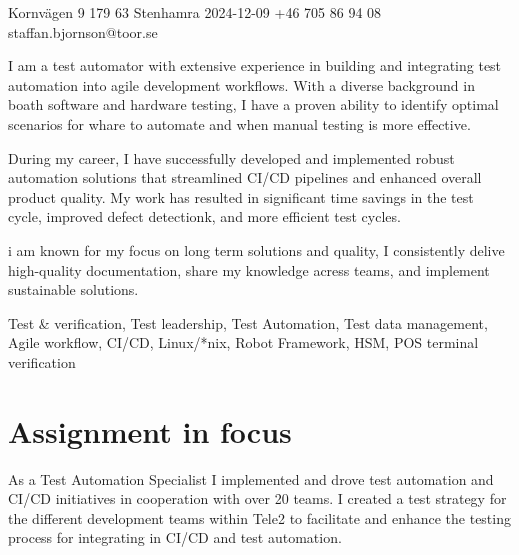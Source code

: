 \documentclass{sobCV}[2015/09/08]
\begin{document}
       {Kornvägen 9}
       {179 63 Stenhamra}
       {2024-12-09}
       {+46 705 86 94 08} 
       {staffan.bjornson@toor.se}






   {
       I am a test automator with extensive experience in building and
       integrating test automation into agile development workflows. With a
       diverse background in boath software and hardware testing, I have a
       proven ability to identify optimal scenarios for whare to automate and
       when manual testing is more effective. 

       During my career, I have successfully developed and implemented robust
       automation solutions that streamlined CI/CD pipelines and enhanced
       overall product quality. My work has resulted in significant time
       savings in the test cycle, improved defect detectionk, and more
       efficient test cycles.

       i am known for my focus on long term solutions and quality, I
       consistently delive high-quality documentation, share my knowledge
       acress teams, and implement sustainable solutions.
   }{
       Test \& verification,
       Test leadership,
       Test Automation, 
       Test data management,
       Agile workflow,
       CI/CD,
       Linux/*nix,
       Robot Framework,
       HSM,
       POS terminal verification
    }


\section{Assignment in focus}
    As a Test Automation Specialist I implemented and drove test automation and
    CI/CD initiatives in cooperation with over 20 teams. I created a test
    strategy for the different development teams within Tele2 to facilitate and
    enhance the testing process for integrating in CI/CD and test automation.
\end{document}
